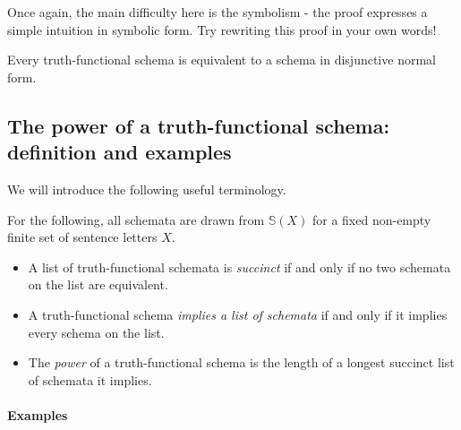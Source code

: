 \begin{aside}
    Once again, the main difficulty here is the symbolism - the proof expresses a simple intuition in symbolic form. Try rewriting this proof in your own words!
\end{aside}

\begin{corollary}\label{dnf-cor}
Every truth-functional schema is equivalent to a schema in disjunctive normal form.
\end{corollary}



\newpage
\subsection{The power of a truth-functional schema: definition and examples}

We will introduce the following useful terminology.
\begin{definition} 
For the following, all schemata are drawn from $\mathbb{S}(X)$ for a fixed non-empty finite set of sentence letters $X$.
\begin{itemize}
\item 
A list of truth-functional schemata is \textit{succinct} if and only if no two schemata on the list are equivalent. 
\item 
A truth-functional schema \textit{implies a list of schemata} if and only if it implies every schema on the list.
\item The \textit{power} of a truth-functional schema is the length of a longest succinct list of schemata it implies.  
\end{itemize}
\end{definition}
\paragraph{Examples}

